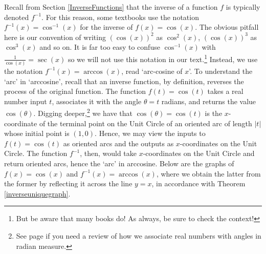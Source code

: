 \documentclass[12pt]{ximera}
\begin{document}
Recall from Section \ref{InverseFunctions} that the inverse of a function $f$ is typically denoted $f^{-1}$.  For this reason, some textbooks use the notation $f^{-1}(x) = \cos^{-1}(x)$ for the inverse of $f(x) = \cos(x)$.  The obvious pitfall here is our convention of writing $(\cos(x))^2$ as $\cos^{2}(x)$, $(\cos(x))^3$ as $\cos^{3}(x)$ and so on.  It is far too easy to confuse $\cos^{-1}(x)$ with  $\frac{1}{\cos(x)} = \sec(x)$ so we will not use this notation in our text.\footnote{But be aware that many books do! As always, be sure to check the context!}  Instead, we use the notation $f^{-1}(x) = \arccos(x)$, read `arc-cosine of $x$'.  To understand the `arc' in `arccosine', recall that an inverse function, by definition, reverses the process of the original function. The function $f(t) = \cos(t)$ takes a real number input $t$, associates it with the angle $\theta = t$ radians, and returns the value $\cos(\theta)$.  Digging deeper,\footnote{See page \pageref{wrappingfunction} if you need a review of how we associate real numbers with angles in radian measure.} we have that $\cos(\theta) = \cos(t)$ is the $x$-coordinate of the terminal point on the Unit Circle of an oriented arc of length $|t|$ whose initial point is $(1, 0)$.  Hence, we may view the inputs to $f(t) = \cos(t)$ as oriented arcs and the outputs as $x$-coordinates on the Unit Circle.  The function $f^{-1}$, then, would take $x$-coordinates on the Unit Circle and return oriented arcs, hence the `arc' in arccosine. Below are the graphs of $f(x) = \cos(x)$ and $f^{-1}(x) = \arccos(x)$, where we obtain the latter from the former by reflecting it across the line $y=x$, in accordance with Theorem \ref{inverseuniquegraph}. 
\end{document}
